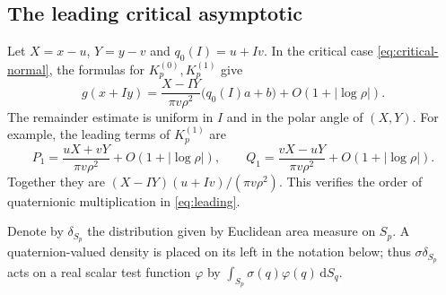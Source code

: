 \documentclass[11pt,a4paper]{article}
\numberwithin{equation}{section}
\theoremstyle{definition}
\theoremstyle{remark}
\newcommand{\dd}{\,\mathrm d}
\begin{document}
\subsection{The leading critical asymptotic}
Let $X=x-u$, $Y=y-v$ and $q_0(I)=u+Iv$. In the critical case
\eqref{eq:critical-normal}, the formulas for $K_p^{(0)},K_p^{(1)}$ give
\begin{equation}\label{eq:leading}
 g(x+Iy)=\frac{X-IY}{\pi v\rho^2}
                \bigl(q_0(I)a+b\bigr)+O(1+|\log\rho|).
\end{equation}
The remainder estimate is uniform in $I$ and in the polar angle of $(X,Y)$.
For example, the leading terms of $K_p^{(1)}$ are
\[
 P_1=\frac{uX+vY}{\pi v\rho^2}+O(1+|\log\rho|),\qquad
 Q_1=\frac{vX-uY}{\pi v\rho^2}+O(1+|\log\rho|).
\]
Together they are $(X-IY)(u+Iv)/(\pi v\rho^2)$. This verifies the order of
quaternionic multiplication in \eqref{eq:leading}.

Denote by $\delta_{S_p}$ the distribution given by Euclidean area measure on
$S_p$. A quaternion-valued density is placed on its left in the notation below;
thus $\sigma\delta_{S_p}$ acts on a real scalar test function $\varphi$ by
$\int_{S_p}\sigma(q)\varphi(q)\dd S_q$.
\end{document}
